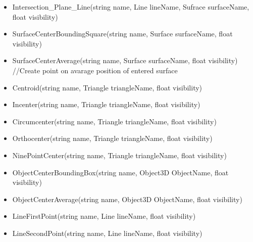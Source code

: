 \begin{itemize}
		\item Intersection\_Plane\_Line(string name, Line lineName, Sufrace surfaceName, float visibility)


		\item SurfaceCenterBoundingSquare(string name, Surface surfaceName, float visibility) 

		\item SurfaceCenterAverage(string name, Surface surfaceName, float visibility) //Create point on avarage position of entered surface

		\item Centroid(string name, Triangle triangleName, float visibility)
		
		\item Incenter(string name, Triangle triangleName, float visibility)
		
		\item Circumcenter(string name, Triangle triangleName, float visibility)
		
		\item Orthocenter(string name, Triangle triangleName, float visibility)
		
		\item NinePointCenter(string name, Triangle triangleName, float visibility)

		\item ObjectCenterBoundingBox(string name, Object3D ObjectName, float visibility) 

		\item ObjectCenterAverage(string name, Object3D ObjectName, float visibility) 

		\item LineFirstPoint(string name, Line lineName, float visibility)
		
		\item LineSecondPoint(string name, Line lineName, float visibility)

\end{itemize}

